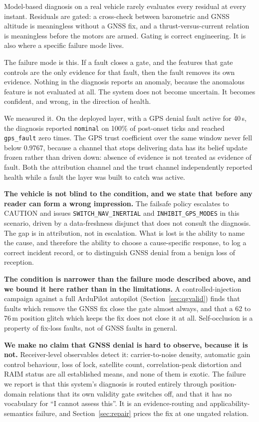 \documentclass[11pt,a4paper]{article}
\newcommand{\code}[1]{\texttt{\small #1}}
\begin{document}
Model-based diagnosis on a real vehicle rarely evaluates every residual at
every instant. Residuals are gated: a cross-check between barometric and GNSS
altitude is meaningless without a GNSS fix, and a thrust-versus-current
relation is meaningless before the motors are armed. Gating is correct
engineering. It is also where a specific failure mode lives.

The failure mode is this. If a fault closes a gate, and the features that gate
controls are the only evidence for that fault, then the fault removes its own
evidence. Nothing in the diagnosis reports an anomaly, because the anomalous
feature is not evaluated at all. The system does not become uncertain. It
becomes confident, and wrong, in the direction of health.

We measured it. On the deployed layer, with a GPS denial fault active for
40\,s, the diagnosis reported \code{nominal} on 100\% of post-onset ticks and
reached \code{gps\_fault} zero times. The GPS trust coefficient over the same
window never fell below 0.9767, because a channel that stops delivering data
has its belief update frozen rather than driven down: absence of evidence is
not treated as evidence of fault. Both the attribution channel and the trust
channel independently reported health while a fault the layer was built to
catch was active.

\textbf{The vehicle is not blind to the condition, and we state that before
any reader can form a wrong impression.} The failsafe policy escalates to
CAUTION and issues \code{SWITCH\_NAV\_INERTIAL} and \code{INHIBIT\_GPS\_MODES}
in this scenario, driven by a data-freshness disjunct that does not consult the
diagnosis. The gap is in attribution, not in escalation. What is lost is the
ability to name the cause, and therefore the ability to choose a
cause-specific response, to log a correct incident record, or to distinguish
GNSS denial from a benign loss of reception.

\textbf{The condition is narrower than the failure mode described above, and
we bound it here rather than in the limitations.} A controlled-injection
campaign against a full ArduPilot autopilot
(Section~\ref{sec:qgvalid}) finds that faults which remove the GNSS fix close
the gate almost always, and that a 62 to 76\,m position glitch which keeps the
fix does not close it at all. Self-occlusion is a property of fix-loss faults,
not of GNSS faults in general.

\textbf{We make no claim that GNSS denial is hard to observe, because it is
not.} Receiver-level observables detect it: carrier-to-noise density, automatic
gain control behaviour, loss of lock, satellite count, correlation-peak
distortion and RAIM status are all established means, and none of them is
exotic. The failure we report is that this system's diagnosis is routed
entirely through position-domain relations that its own validity gate switches
off, and that it has no vocabulary for ``I cannot assess this''. It is an
evidence-routing and applicability-semantics failure, and Section~\ref{sec:repair}
prices the fix at one ungated relation.
\end{document}
